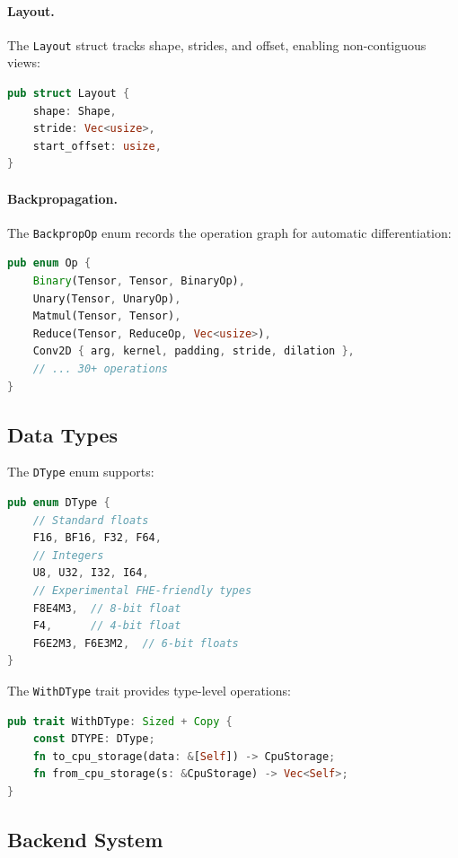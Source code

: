 \documentclass[11pt,twocolumn]{article}
\begin{document}
\paragraph{Layout.} The \texttt{Layout} struct tracks shape, strides, and offset, enabling non-contiguous views:

\begin{lstlisting}[language=Rust]
pub struct Layout {
    shape: Shape,
    stride: Vec<usize>,
    start_offset: usize,
}
\end{lstlisting}

\paragraph{Backpropagation.} The \texttt{BackpropOp} enum records the operation graph for automatic differentiation:

\begin{lstlisting}[language=Rust]
pub enum Op {
    Binary(Tensor, Tensor, BinaryOp),
    Unary(Tensor, UnaryOp),
    Matmul(Tensor, Tensor),
    Reduce(Tensor, ReduceOp, Vec<usize>),
    Conv2D { arg, kernel, padding, stride, dilation },
    // ... 30+ operations
}
\end{lstlisting}

\subsection{Data Types}

The \texttt{DType} enum supports:

\begin{lstlisting}[language=Rust]
pub enum DType {
    // Standard floats
    F16, BF16, F32, F64,
    // Integers
    U8, U32, I32, I64,
    // Experimental FHE-friendly types
    F8E4M3,  // 8-bit float
    F4,      // 4-bit float
    F6E2M3, F6E3M2,  // 6-bit floats
}
\end{lstlisting}

The \texttt{WithDType} trait provides type-level operations:

\begin{lstlisting}[language=Rust]
pub trait WithDType: Sized + Copy {
    const DTYPE: DType;
    fn to_cpu_storage(data: &[Self]) -> CpuStorage;
    fn from_cpu_storage(s: &CpuStorage) -> Vec<Self>;
}
\end{lstlisting}

\subsection{Backend System}
\end{document}
